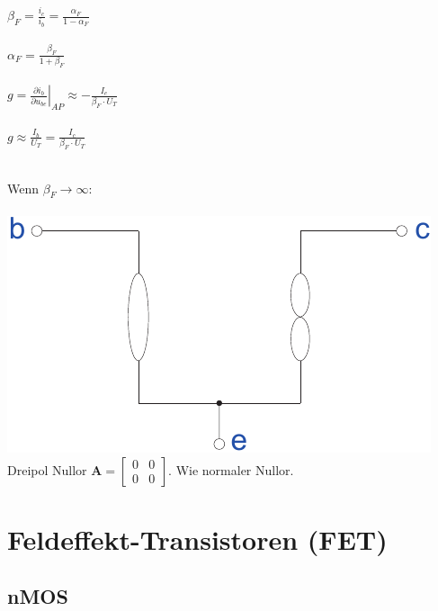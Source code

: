 \documentclass[a4paper,twocolumn,10pt]{article}
\begin{document}
\begin{minipage}[t]{0.23\textwidth}
$\beta_F=\frac{i_c}{i_b}=\frac{\alpha_F}{1-\alpha_F}$\\\\
$\alpha_F=\frac{\beta_F}{1+\beta_F}$\\\\
$g=\left.\frac{\partial i_b}{\partial u_{be}}\right|_{AP}\approx -\frac{I_e}{\beta_F\cdot U_T}$\\\\
$g\approx \frac{I_b}{U_T}=\frac{I_c}{\beta_F\cdot U_T}$\\\\
\end{minipage}
\hfill
\begin{minipage}[t]{0.23\textwidth}
Wenn $\beta_F \rightarrow \infty$:\\\\
\includegraphics[width=\textwidth]{img/Nullormodell}
Dreipol Nullor $\textbf{A}=\begin{bmatrix}0 & 0\\ 0 & 0\end{bmatrix}$. Wie normaler Nullor.
\end{minipage}

\section*{Feldeffekt-Transistoren (FET)}
\subsection*{nMOS}
\end{document}
